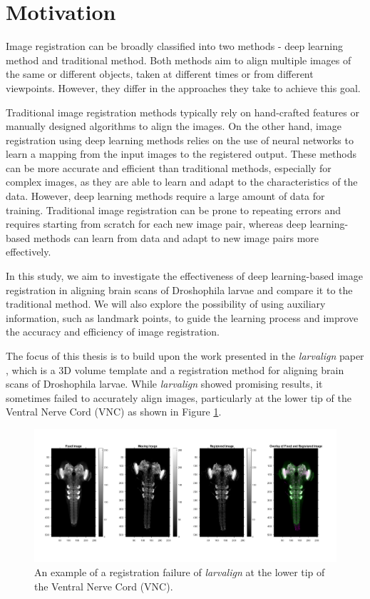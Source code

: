 \documentclass{book}
\begin{document}
	\section{Motivation}
	Image registration can be broadly classified into two methods - deep learning method and traditional method. Both methods aim to align multiple images of the same or different objects, taken at different times or from different viewpoints. However, they differ in the approaches they take to achieve this goal.
	
	Traditional image registration methods typically rely on hand-crafted features or manually designed algorithms to align the images. On the other hand, image registration using deep learning methods relies on the use of neural networks to learn a mapping from the input images to the registered output. These methods can be more accurate and efficient than traditional methods, especially for complex images, as they are able to learn and adapt to the characteristics of the data. However, deep learning methods require a large amount of data for training. Traditional image registration can be prone to repeating errors and requires starting from scratch for each new image pair, whereas deep learning-based methods can learn from data and adapt to new image pairs more effectively.
	
	In this study, we aim to investigate the effectiveness of deep learning-based image registration in aligning brain scans of Droshophila larvae and compare it to the traditional method. We will also explore the possibility of using auxiliary information, such as landmark points, to guide the learning process and improve the accuracy and efficiency of image registration.
	
	The focus of this thesis is to build upon the work presented in the \textit{larvalign} paper \cite{larvalign}, which is a 3D volume template and a registration method for aligning brain scans of Droshophila larvae. While \textit{larvalign} showed promising results, it sometimes failed to accurately align images, particularly at the lower tip of the Ventral Nerve Cord (VNC) as shown in Figure \ref{fig:Registraion_Failure}.
	
	\begin{figure}[h!]
		\centering
		\includegraphics[width=\linewidth]{resources/motivation_fig_1.jpg}
		\caption{An example of a registration failure of \textit{larvalign} \cite{larvalign} at the lower tip of the Ventral Nerve Cord (VNC).}
		\label{fig:Registraion_Failure}
	\end{figure}
	
\end{document}

